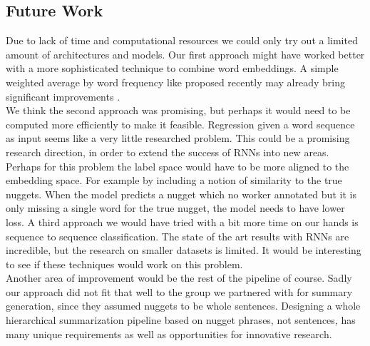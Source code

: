 \subsection{Future Work}
Due to lack of time and computational resources we could only try out a  limited amount of architectures and models.
Our first approach might have worked better with a more sophisticated technique to combine word embeddings. A simple weighted average by word frequency like proposed recently may already bring significant improvements \cite{sif2016}.\\
We think the second approach was promising, but perhaps it would need to be computed more efficiently to make it feasible. Regression given a word sequence as input seems like a very little researched problem. This could be a promising research direction, in order to extend the success of RNNs into new areas. Perhaps for this problem the label space would have to be more aligned to the embedding space. For example by including a notion of similarity to the true nuggets. When the model predicts a nugget which no worker annotated but it is only missing a single word for the true nugget, the model needs to have lower loss.
A third approach we would have tried with a bit more time on our hands is sequence to sequence classification. The state of the art results with RNNs are incredible, but the research on smaller datasets is limited. It would be interesting to see if these techniques would work on this problem.\\
Another area of improvement would be the rest of the pipeline of course. Sadly our approach did not fit that well to the group we partnered with for summary generation, since they assumed nuggets to be whole sentences. Designing a whole hierarchical summarization pipeline based on nugget phrases, not sentences, has many unique requirements as well as opportunities for innovative research.